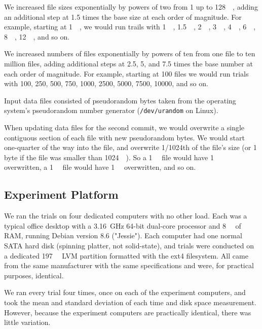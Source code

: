 We increased file sizes exponentially by powers of two from \SI{1}{\byte} up to \SI{128}{\gibi\byte}, adding an additional step at \num{1.5} times the base size at each order of magnitude.
For example, starting at \SI{1}{\mebi\byte}, we would run trails with \SI{1}{\mebi\byte}, \SI{1.5}{\mebi\byte}, \SI{2}{\mebi\byte}, \SI{3}{\mebi\byte}, \SI{4}{\mebi\byte}, \SI{6}{\mebi\byte}, \SI{8}{\mebi\byte}, \SI{12}{\mebi\byte}, and so on.

We increased numbers of files exponentially by powers of ten from one file to ten million files, adding additional steps at \num{2.5}, \num{5}, and \num{7.5} times the base number at each order of magnitude.
For example, starting at \num{100} files we would run trials with \num{100}, \num{250}, \num{500}, \num{750}, \num{1000}, \num{2500}, \num{5000}, \num{7500}, \num{10000}, and so on.

Input data files consisted of pseudorandom bytes taken from the operating system's pseudorandom number generator (\lstinline{/dev/urandom} on Linux).

When updating data files for the second \gls{commit}, we would overwrite a single contiguous section of each file with new pseudorandom bytes.
We would start one-quarter of the way into the file, and overwrite \num{1/1024}th of the file's size (or 1 byte if the file was smaller than \SI{1024}{\kibi\byte}).
So a \SI{1}{\mebi\byte} file would have \SI{1}{\kibi\byte} overwritten, a \SI{1}{\gibi\byte} file would have \SI{1}{\mebi\byte} overwritten, and so on.

%

\subsection{Experiment Platform}

We ran the trials on four dedicated computers with no other load.
Each was a typical office desktop with a \SI{3.16}{\giga\hertz} \num{64}-bit dual-core processor and \SI{8}{\gibi\byte} of RAM, running Debian version 8.6 ("Jessie").
Each computer had one normal SATA hard disk (spinning platter, not solid-state), and trials were conducted on a dedicated \SI{197}{\gibi\byte} LVM partition formatted with the ext4 filesystem.
All came from the same manufacturer with the same specifications and were, for practical purposes, identical.

We ran every trial four times, once on each of the experiment computers, and took the mean and standard deviation of each time and disk space measurement.
However, because the experiment computers are practically identical, there was little variation.

%

